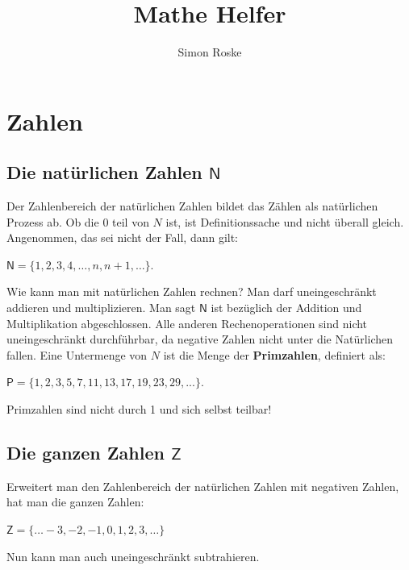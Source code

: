 \documentclass[letterpaper, titlepage]{article}
\author{Simon Roske}
\title{Mathe Helfer}
\begin{document}
\maketitle

\tableofcontents
\listoffigures

\newpage

\newcommand{\skiptwolines}{
    \newline %
    \newline %
}

\newcommand{\skiptwolineswithcenteredexpr}[1]{
    \vspace{\baselineskip} %
    \begin{center}
        #1 %
    \end{center}
    \vspace{\baselineskip} %
}

\newcommand{\absatzformel}{
    \hfill
    \break
}

\section{Zahlen}\label{Zahlen}

\vspace{0.7cm}

\subsection{Die natürlichen Zahlen $\mathsf{N}$}\label{Die natürlichen Zahlen}
Der Zahlenbereich der natürlichen Zahlen bildet das Zählen als natürlichen Prozess ab. Ob die 0 teil von $N$ ist, ist Definitionssache und nicht überall gleich. Angenommen, das sei nicht der Fall, dann gilt:
\skiptwolineswithcenteredexpr{$\mathsf{N}=\{1,2,3,4,…,n,n+1,…\}$.}
Wie kann man mit natürlichen Zahlen rechnen? Man darf uneingeschränkt addieren und multiplizieren. Man sagt $\mathsf{N}$ ist bezüglich der Addition und Multiplikation abgeschlossen. Alle anderen Rechenoperationen sind nicht uneingeschränkt durchführbar, da negative Zahlen nicht unter die Natürlichen fallen. Eine Untermenge von $N$ ist die Menge der \textbf{Primzahlen}, definiert als: 
\skiptwolineswithcenteredexpr{$\mathsf{P}=\{1,2,3,5,7,11,13,17,19,23,29,...\}$.}
Primzahlen sind nicht durch 1 und sich selbst teilbar!

\vspace{0.35cm}

\subsection{Die ganzen Zahlen $\mathsf{Z}$}\label{Die ganzen Zahlen}
Erweitert man den Zahlenbereich der natürlichen Zahlen mit negativen Zahlen, hat man die ganzen Zahlen: 
\skiptwolineswithcenteredexpr{$\mathsf{Z}=\{…-3,-2,-1,0,1,2,3,…\}$}
Nun kann man auch uneingeschränkt subtrahieren.
\end{document}
